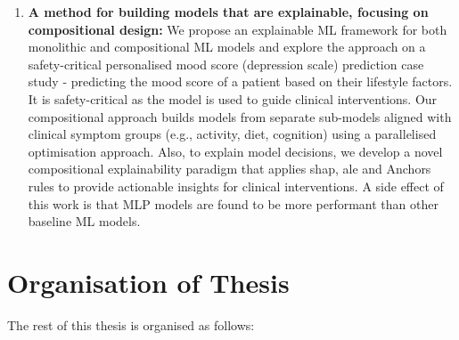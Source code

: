 \begin{enumerate}
\item \textbf{A method for building models that are explainable, focusing on compositional design:} We propose an explainable ML framework for both monolithic and compositional ML models and explore the approach on a safety-critical personalised mood score (depression scale) prediction case study - predicting the mood score of a patient based on their lifestyle factors. It is safety-critical as the model is used to guide clinical interventions. Our compositional approach builds models from separate sub-models aligned with clinical symptom groups (e.g., activity, diet, cognition) using a parallelised optimisation approach. Also, to explain model decisions, we develop a novel compositional explainability paradigm that applies \gls{shap}, \gls{ale} and Anchors rules to provide actionable insights for clinical interventions. A side effect of this work is that MLP models are found to be more performant than other baseline ML models.
\end{enumerate}




\section{Organisation of Thesis}

The rest of this thesis is organised as follows:

